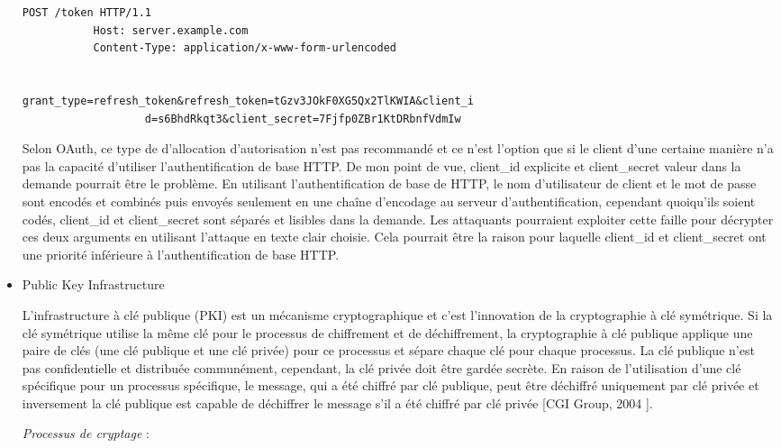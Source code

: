 \begin{itemize}
\begin{verbatim}
POST /token HTTP/1.1
           Host: server.example.com
           Content-Type: application/x-www-form-urlencoded


grant_type=refresh_token&refresh_token=tGzv3JOkF0XG5Qx2TlKWIA&client_i
                   d=s6BhdRkqt3&client_secret=7Fjfp0ZBr1KtDRbnfVdmIw
\end{verbatim}



Selon OAuth, ce type de d'allocation d'autorisation n'est pas recommandé et ce n'est  l'option que si le client d'une certaine manière n'a pas la capacité d'utiliser l'authentification de base HTTP. De mon point de vue, client\_id explicite et client\_secret valeur dans la demande pourrait être le problème. En utilisant l'authentification de base de HTTP, le nom d'utilisateur de client et le mot de passe sont encodés et combinés puis envoyés seulement en une chaîne d'encodage au serveur d'authentification, cependant quoiqu'ils soient codés, client\_id et client\_secret sont séparés et lisibles dans la demande. Les attaquants pourraient exploiter cette faille pour décrypter ces deux arguments en utilisant l'attaque en texte clair choisie. Cela pourrait être la raison pour laquelle client\_id et client\_secret ont une priorité inférieure à l'authentification de base HTTP.
\item Public Key Infrastructure

L'infrastructure à clé publique (PKI) est un mécanisme cryptographique et c'est l'innovation de la cryptographie à clé symétrique. Si la clé symétrique utilise la même clé pour le processus de chiffrement et de déchiffrement, la cryptographie à clé publique applique une paire de clés (une clé publique et une clé privée) pour ce processus et sépare chaque clé pour chaque processus. La clé publique n'est pas confidentielle et distribuée communément, cependant, la clé privée doit être gardée secrète. En raison de l'utilisation d'une clé spécifique pour un processus spécifique, le message, qui a été chiffré par clé publique, peut être déchiffré uniquement par clé privée et inversement la clé publique est capable de déchiffrer le message s'il a été chiffré par clé privée [CGI Group, 2004 ].

\textit{Processus de cryptage} :


\end{itemize}
